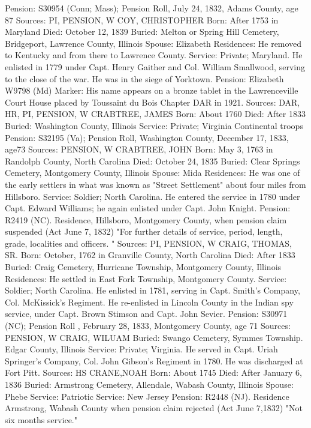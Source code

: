 Pension: S30954 (Conn; Mass); Pension Roll, July 24, 1832, Adams County, age 87 
Sources: PI, PENSION, W 
COY, CHRISTOPHER 
Born: After 1753 in Maryland 
Died: October 12, 1839 
Buried: Melton or Spring Hill Cemetery, Bridgeport, Lawrence County, Illinois 
Spouse: Elizabeth 
Residences: He removed to Kentucky and from there to Lawrence County. 
Service: Private; Maryland. He enlisted in 1779 under Capt. Henry Gaither and Col. William Smallwood, serving to the close of the war. He was in the siege of Yorktown. 
Pension: Elizabeth W9798 (Md) 
Marker: His name appears on a bronze tablet in the Lawrenceville Court House placed by Toussaint du Bois Chapter DAR in 1921. 
Sources: DAR, HR, PI, PENSION, W 
CRABTREE, JAMES 
Born: About 1760 
Died: After 1833
Buried: Washington County, Illinois 
Service: Private; Virginia Continental troops 
Pension: S32195 (Va); Pension Roll, Washington County, December 17, 1833, age73 
Sources: PENSION, W 
CRABTREE, JOHN 
Born: May 3, 1763 in Randolph County, North Carolina 
Died: October 24, 1835 
Buried: Clear Springs Cemetery, Montgomery County, Illinois 
Spouse: Mida 
Residences: He was one of the early settlers in what was known as "Street Settlement" about four miles from Hillsboro.
Service: Soldier; North Carolina. He entered the service in 1780 under Capt. Edward Williams; he again enlisted under Capt. John Knight. 
Pension: R2419 (NC). Residence, Hillsboro, Montgomery County, when pension claim suspended (Act June 7, 1832) "For further details of service, period, length, grade, localities and officers. " 
Sources: PI, PENSION, W 
CRAIG, THOMAS, SR. 
Born: October, 1762 in Granville County, North Carolina 
Died: After 1833 
Buried: Craig Cemetery, Hurricane Township, Montgomery County, Illinois 
Residences: He settled in East Fork Township, Montgomery County. 
Service: Soldier; North Carolina. He enlisted in 1781, serving in Capt. Smith's Company, Col. McKissick's Regiment. He re-enlisted in Lincoln County in the Indian spy service, under Capt. Brown Stimson and Capt. John Sevier. 
Pension: S30971 (NC); Pension Roll , February 28, 1833, Montgomery County, age 71 
Sources: PENSION, W 
CRAIG, WILUAM 
Buried: Swango Cemetery, Symmes Township. Edgar County, Illinois 
Service: Private; Virginia. He served in Capt. Uriah Springer's Company, Col. John Gibson's Regiment in 1780. He was discharged at Fort Pitt. 
Sources: HS 
CRANE,NOAH 
Born: About 1745 
Died: After January 6, 1836 
Buried: Armstrong Cemetery, Allendale, Wabash County, Illinois 
Spouse: Phebe 
Service: Patriotic 
Service: New Jersey 
Pension: R2448 (NJ). Residence Armstrong, Wabash County when pension claim rejected (Act June 7,1832) "Not six months service." 
